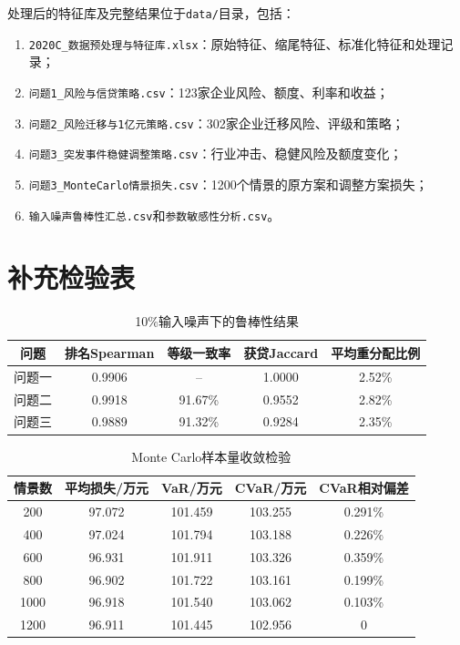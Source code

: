 \documentclass[UTF8,a4paper,12pt,fontset=fandol]{ctexart}
\numberwithin{equation}{section}
\begin{document}
处理后的特征库及完整结果位于\texttt{data/}目录，包括：
\begin{enumerate}
  \item \texttt{2020C\_数据预处理与特征库.xlsx}：原始特征、缩尾特征、标准化特征和处理记录；
  \item \texttt{问题1\_风险与信贷策略.csv}：123家企业风险、额度、利率和收益；
  \item \texttt{问题2\_风险迁移与1亿元策略.csv}：302家企业迁移风险、评级和策略；
  \item \texttt{问题3\_突发事件稳健调整策略.csv}：行业冲击、稳健风险及额度变化；
  \item \texttt{问题3\_MonteCarlo情景损失.csv}：1200个情景的原方案和调整方案损失；
  \item \texttt{输入噪声鲁棒性汇总.csv}和\texttt{参数敏感性分析.csv}。
\end{enumerate}

\section{补充检验表}

\begin{table}[H]
\centering
\caption{10\%输入噪声下的鲁棒性结果}
\begin{tabular}{ccccc}
\toprule
问题 & 排名Spearman & 等级一致率 & 获贷Jaccard & 平均重分配比例\\
\midrule
问题一 & 0.9906 & -- & 1.0000 & 2.52\%\\
问题二 & 0.9918 & 91.67\% & 0.9552 & 2.82\%\\
问题三 & 0.9889 & 91.32\% & 0.9284 & 2.35\%\\
\bottomrule
\end{tabular}
\end{table}

\begin{table}[H]
\centering
\caption{Monte Carlo样本量收敛检验}
\begin{tabular}{ccccc}
\toprule
情景数 & 平均损失/万元 & VaR/万元 & CVaR/万元 & CVaR相对偏差\\
\midrule
200 & 97.072 & 101.459 & 103.255 & 0.291\%\\
400 & 97.024 & 101.794 & 103.188 & 0.226\%\\
600 & 96.931 & 101.911 & 103.326 & 0.359\%\\
800 & 96.902 & 101.722 & 103.161 & 0.199\%\\
1000 & 96.918 & 101.540 & 103.062 & 0.103\%\\
1200 & 96.911 & 101.445 & 102.956 & 0\\
\bottomrule
\end{tabular}
\end{table}
\end{document}
